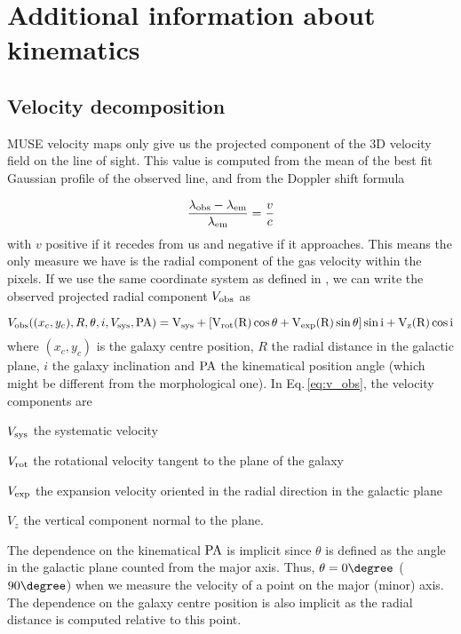 \clearpage
\section{Additional information about kinematics}
\label{sec:info_on_kinematics}

\subsection{Velocity decomposition}
\label{sec:vel_decompo}

MUSE velocity maps only give us the projected component of the 3D velocity field on the line of sight. This value is computed from the mean of the best fit Gaussian profile of the observed line, and from the Doppler shift formula

\begin{equation}
	\frac{\lambda_{\rm{obs}} - \lambda_{\rm{em}}}{\lambda_{\rm{em}}} = \frac{v}{c}
\end{equation}
with $v$ positive if it recedes from us and negative if it approaches. This means the only measure we have is the radial component of the gas velocity within the pixels. If we use the same coordinate system as defined in , we can write the observed projected radial component $V_{\rm{obs}}$ as 

\begin{equation}
	V_{\rm{obs}} ( (x_c , y_c) , R, \theta , i, V_{\rm{sys}} , \rm{PA} ) = V_{\rm{sys}} + \left [ V_{\rm{rot}} (R) \cos \theta + V_{\rm{exp}} (R) \sin \theta \right ] \sin i + V_z (R) \cos i
	\label{eq:v_obs}
\end{equation}
where $(x_c , y_c)$ is the galaxy centre position, $R$ the radial distance in the galactic plane, $i$ the galaxy inclination and $\rm{PA}$ the kinematical position angle (which might be different from the morphological one). In Eq.\,\ref{eq:v_obs}, the velocity components are
\begin{enumerate*}[label={(\alph*)}]
	\item $V_{\rm{sys}}$ the systematic velocity
	\item $V_{\rm{rot}}$ the rotational velocity tangent to the plane of the galaxy
	\item $V_{\rm{exp}}$ the expansion velocity oriented in the radial direction in the galactic plane
	\item $V_z$ the vertical component normal to the plane.
\end{enumerate*}
The dependence on the kinematical $\rm{PA}$ is implicit since $\theta$ is defined as the angle in the galactic plane counted from the major axis. Thus, $\theta = 0 \degree$ ($90 \degree$) when we measure the velocity of a point on the major (minor) axis. The dependence on the galaxy centre position is also implicit as the radial distance is computed relative to this point. \\

